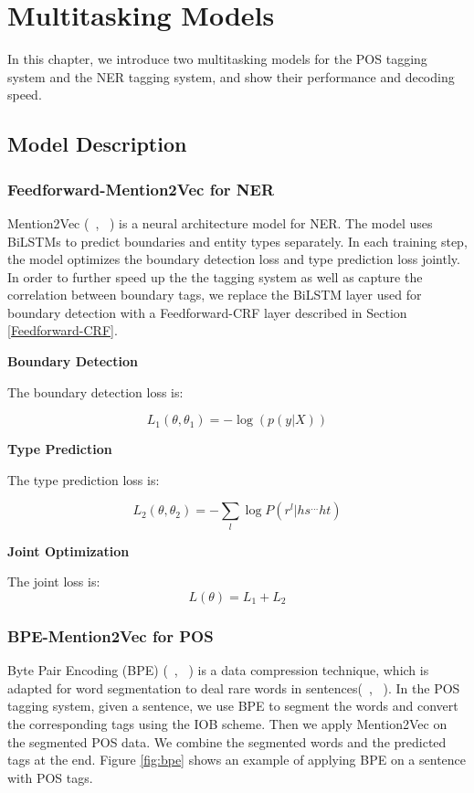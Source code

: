 \documentclass{sfuthesis}
\begin{document}
\chapter{Multitasking Models}
In this chapter, we introduce two multitasking models for the POS tagging system and the NER tagging system, and show their performance and decoding speed. 
\section{Model Description}
\subsection{Feedforward-Mention2Vec for NER}
Mention2Vec (~\citeauthor{stratos2016mention2vec}, ~\citeyear{stratos2016mention2vec}) is a neural architecture model for NER. The model uses BiLSTMs to predict boundaries and entity types separately. In each training step, the model optimizes the boundary detection loss and type prediction loss jointly.  In order to further speed up the the tagging system as well as capture the correlation between boundary tags, we replace the BiLSTM layer used for boundary detection with a Feedforward-CRF layer described in Section \ref{Feedforward-CRF}.

\textbf{Boundary Detection} 

The boundary detection loss is:

\begin{equation}
  L_{1}\left( \theta ,\theta _{1}\right) =-\log \left( p\left( y|X\right) \right) 
\end{equation}

\textbf{Type Prediction}

The type prediction loss is:

\begin{equation}
  L_{2}\left( \theta ,\theta _{2}\right) =-\sum _{l}\log P\left( r^{l}|hs^{\ldots }ht\right)
\end{equation}

\textbf{Joint Optimization}

The joint loss is:
\begin{equation}
  L\left( \theta \right) =L_{1}+L_{2}  
\end{equation}

\subsection{BPE-Mention2Vec for POS}
Byte Pair Encoding (BPE) (~\citeauthor{gage1994new}, ~\citeyear{gage1994new}) is a data compression technique, which is adapted for word segmentation to deal rare words in sentences(~\citeauthor{sennrich2015neural}, ~\citeyear{sennrich2015neural}). In the POS tagging system, given a sentence, we use BPE to segment the words and convert the corresponding tags using the IOB scheme. Then we apply Mention2Vec on the segmented POS data. We combine the segmented words and the predicted tags at the end. Figure \ref{fig:bpe} shows an example of applying BPE on a sentence with POS tags. 
\end{document}
